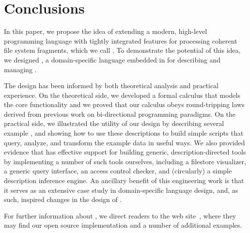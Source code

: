 \section{Conclusions}
\label{sec:conclusion}


In this paper, we propose the idea of extending a modern, high-level
programming language with tightly integrated features for
processing coherent file system fragments, which we call
\filestores{}.  To demonstrate the
potential of this idea, we designed \forest{}, a
domain-specific language 
embedded in \haskell{}
for describing and managing \filestores{}.  

The \forest{} design has been informed by both
theoretical analysis and practical experience.
On the theoretical side, 
we developed a formal
calculus that models the core \forest{} functionality and
we proved that our calculus obeys round-tripping laws
derived from previous work on bi-directional programming paradigms.
On the practical side, 
we illustrated the utility of our design
by describing several example \filestores{}, and showing how
to use these descriptions
to build simple \haskell{} scripts that query,  
analyze, and transform the example data in useful ways.
We also provided evidence that
\forest{} has effective support for building
generic, description-directed tools by 
implementing a number of such 
tools ourselves, including a filestore visualizer,
a generic query interface, an access control checker, and
(circularly) a simple description inference engine.
An ancillary benefit of this 
engineering work is that it
serves as an extensive case study in domain-specific
language design, and, as such, inspired changes in the design of
\template{}.  

For further information about \forest{}, we direct readers to
the \forest{} web site~\cite{forest-web-site}, where they may find
our open source implementation and a number of
additional examples.

